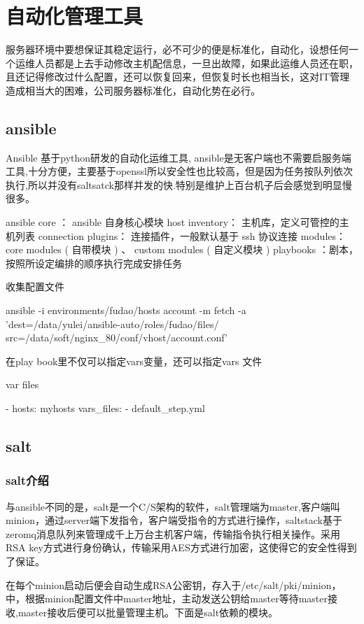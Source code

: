 \chapter{自动化管理工具}
服务器环境中要想保证其稳定运行，必不可少的便是标准化，自动化，设想任何一个运维人员都是上去手动修改主机配信息，一旦出故障，如果此运维人员还在职，且还记得修改过什么配置，还可以恢复回来，但恢复时长也相当长，这对IT管理造成相当大的困难，公司服务器标准化，自动化势在必行。
\section{ansible}
Ansible 基于python研发的自动化运维工具, ansible是无客户端也不需要启服务端工具,十分方便，主要基于openssl所以安全性也比较高，但是因为任务按队列依次执行,所以并没有saltsatck那样并发的快.特别是维护上百台机子后会感觉到明显慢很多。

ansible core ： ansible 自身核心模块
host inventory： 主机库，定义可管控的主机列表
connection plugins： 连接插件，一般默认基于 ssh 协议连接
modules：core modules ( 自带模块 ) 、 custom modules ( 自定义模块 )
playbooks ：剧本，按照所设定编排的顺序执行完成安排任务

收集配置文件

ansible -i environments/fudao/hosts  account -m fetch -a 'dest=/data/yulei/ansible-auto/roles/fudao/files/ src=/data/soft/nginx_80/conf/vhost/account.conf'

在play book里不仅可以指定vars变量，还可以指定vars 文件

var files

- hosts: myhosts
  vars_files:
    - default_step.yml


\section{salt}

\subsection{salt介绍}
与ansible不同的是，salt是一个C/S架构的软件，salt管理端为master,客户端叫minion，通过server端下发指令，客户端受指令的方式进行操作，saltstack基于zeromq消息队列来管理成千上万台主机客户端，传输指令执行相关操作。采用RSA key方式进行身份确认，传输采用AES方式进行加密，这使得它的安全性得到了保证。

在每个minion启动后便会自动生成RSA公密钥，存入于/etc/salt/pki/minion，中，根据minion配置文件中master地址，主动发送公钥给master等待master接收,master接收后便可以批量管理主机。下面是salt依赖的模块。


